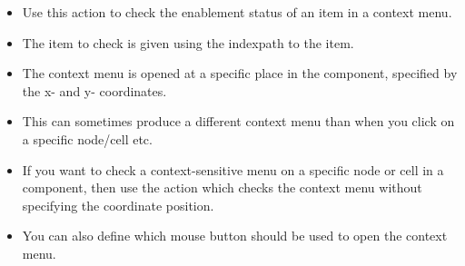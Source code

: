 
\begin{itemize}
\item Use this action to check the enablement status of an item in a context menu.
\item The item to check is given using the indexpath to the item.
\item The context menu is opened at a specific place in the component, specified by the x- and y- coordinates. 
\item This can sometimes produce a different context menu than when you click on a specific node/cell etc.
\item If you want to check a context-sensitive menu on a specific node or cell in a component, then use the action which checks the context menu without specifying the coordinate position.
\item You can also define which mouse button should be used to open the context menu. 
\end{itemize}
